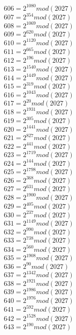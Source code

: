 \documentclass[12pt, letterpaper]{article}
\begin{document}
\begin{itemize}
\begin{multicols}{3}
$606= 2^{1080} mod (2027)$\\
$607= 2^{354} mod (2027)$\\
$608= 2^{1069} mod (2027)$\\
$609= 2^{620} mod (2027)$\\
$610= 2^{1120} mod (2027)$\\
$611= 2^{665} mod (2027)$\\
$612= 2^{196} mod (2027)$\\
$613= 2^{1540} mod (2027)$\\
$614= 2^{1449} mod (2027)$\\
$615= 2^{319} mod (2027)$\\
$616= 2^{1043} mod (2027)$\\
$617= 2^{20} mod (2027)$\\
$618= 2^{1931} mod (2027)$\\
$619= 2^{305} mod (2027)$\\
$620= 2^{1441} mod (2027)$\\
$621= 2^{827} mod (2027)$\\
$622= 2^{441} mod (2027)$\\
$623= 2^{1719} mod (2027)$\\
$624= 2^{144} mod (2027)$\\
$625= 2^{1798} mod (2027)$\\
$626= 2^{368} mod (2027)$\\
$627= 2^{631} mod (2027)$\\
$628= 2^{1900} mod (2027)$\\
$629= 2^{405} mod (2027)$\\
$630= 2^{237} mod (2027)$\\
$631= 2^{1149} mod (2027)$\\
$632= 2^{990} mod (2027)$\\
$633= 2^{738} mod (2027)$\\
$634= 2^{560} mod (2027)$\\
$635= 2^{1908} mod (2027)$\\
$636= 2^{90} mod (2027)$\\
$637= 2^{1342} mod (2027)$\\
$638= 2^{1921} mod (2027)$\\
$639= 2^{1986} mod (2027)$\\
$640= 2^{1976} mod (2027)$\\
$641= 2^{592} mod (2027)$\\
$642= 2^{1528} mod (2027)$\\
$643= 2^{190} mod (2027)$\\

\end{multicols}
\end{itemize}
\end{document}
